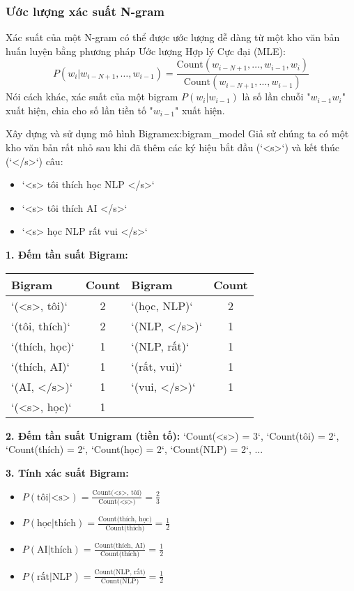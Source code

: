 \subsubsection{Ước lượng xác suất N-gram}
Xác suất của một N-gram có thể được ước lượng dễ dàng từ một kho văn bản huấn luyện bằng phương pháp Ước lượng Hợp lý Cực đại (MLE):
$$ P(w_i | w_{i-N+1}, \dots, w_{i-1}) = \frac{\text{Count}(w_{i-N+1}, \dots, w_{i-1}, w_i)}{\text{Count}(w_{i-N+1}, \dots, w_{i-1})} $$
Nói cách khác, xác suất của một bigram $P(w_i|w_{i-1})$ là số lần chuỗi "$w_{i-1} w_i$" xuất hiện, chia cho số lần tiền tố "$w_{i-1}$" xuất hiện.

\begin{example}{Xây dựng và sử dụng mô hình Bigram}{ex:bigram_model}
    Giả sử chúng ta có một kho văn bản rất nhỏ sau khi đã thêm các ký hiệu bắt đầu (`<s>`) và kết thúc (`</s>`) câu:
    \begin{itemize}
        \item `<s> tôi thích học NLP </s>`
        \item `<s> tôi thích AI </s>`
        \item `<s> học NLP rất vui </s>`
    \end{itemize}

    \textbf{1. Đếm tần suất Bigram:}
    \begin{center}
    \begin{tabular}{|l|c||l|c|}
        \hline
        \textbf{Bigram} & \textbf{Count} & \textbf{Bigram} & \textbf{Count} \\
        \hline
        `(<s>, tôi)` & 2 & `(học, NLP)` & 2 \\
        `(tôi, thích)` & 2 & `(NLP, </s>)` & 1 \\
        `(thích, học)` & 1 & `(NLP, rất)` & 1 \\
        `(thích, AI)` & 1 & `(rất, vui)` & 1 \\
        `(AI, </s>)` & 1 & `(vui, </s>)` & 1 \\
        `(<s>, học)` & 1 & & \\
        \hline
    \end{tabular}
    \end{center}

    \textbf{2. Đếm tần suất Unigram (tiền tố):}
    `Count(<s>) = 3`, `Count(tôi) = 2`, `Count(thích) = 2`, `Count(học) = 2`, `Count(NLP) = 2`, ...

    \textbf{3. Tính xác suất Bigram:}
    \begin{itemize}
        \item $P(\text{tôi} | \text{<s>}) = \frac{\text{Count(<s>, tôi)}}{\text{Count(<s>)}} = \frac{2}{3}$
        \item $P(\text{học} | \text{thích}) = \frac{\text{Count(thích, học)}}{\text{Count(thích)}} = \frac{1}{2}$
        \item $P(\text{AI} | \text{thích}) = \frac{\text{Count(thích, AI)}}{\text{Count(thích)}} = \frac{1}{2}$
        \item $P(\text{rất} | \text{NLP}) = \frac{\text{Count(NLP, rất)}}{\text{Count(NLP)}} = \frac{1}{2}$
    \end{itemize}


\end{example}
